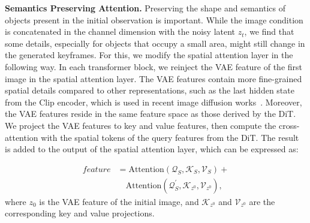 \documentclass[letterpaper, 10 pt, conference]{ieeeconf}  %
\begin{document}
\noindent\textbf{Semantics Preserving Attention.} Preserving the shape and semantics of objects present in the initial observation is important. While the image condition is concatenated in the channel dimension with the noisy latent $z_t$, we find that some details, especially for objects that occupy a small area, might still change in the generated keyframes. For this, we modify the spatial attention layer in the following way. In each transformer block, we reinject the VAE feature of the first image in the spatial attention layer. The VAE features contain more fine-grained spatial details compared to other representations, such as the last hidden state from the Clip encoder, which is used in recent image diffusion works~\cite{ipadapter}. Moreover, the VAE features reside in the same feature space as those derived by the DiT. We project the VAE features to key and value features, then compute the cross-attention with the spatial tokens of the query features from the DiT. The result is added to the output of the spatial attention layer, which can be expressed as:

\begin{equation}
\begin{split}
    feature &= \textrm{Attention}(\mathcal{Q}_S, \mathcal{K}_S, \mathcal{V}_S) + \\
    &\quad \textrm{Attention}(\mathcal{Q}^{'}_S, \mathcal{K}_{z^0}, \mathcal{V}_{z^0}),
\end{split}
\end{equation}
where $z_{0}$ is the VAE feature of the initial image, and $\mathcal{K}_{z^0}$ and $\mathcal{V}_{z^0}$ are the corresponding key and value projections.



\end{document}
